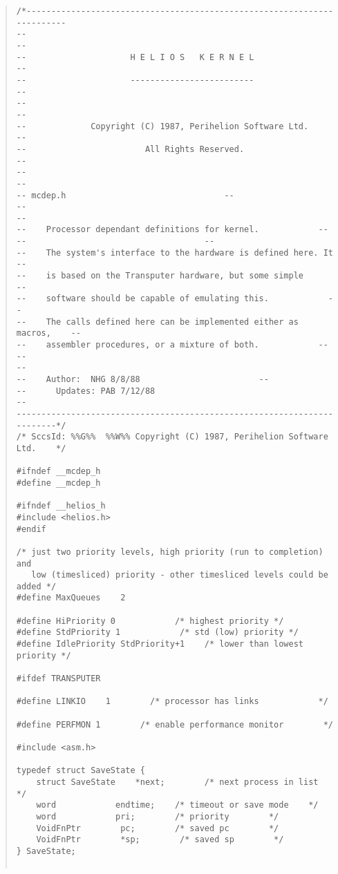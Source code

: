 \begin {quote}
\scriptsize
\begin{verbatim}
/*------------------------------------------------------------------------
--                                                                      --
--                     H E L I O S   K E R N E L                        --
--                     -------------------------                        --
--                                                                      --
--             Copyright (C) 1987, Perihelion Software Ltd.             --
--                        All Rights Reserved.                          --
--                                                                      --
-- mcdep.h                                --
--                                                                      --
--    Processor dependant definitions for kernel.            --
--                                    --
--    The system's interface to the hardware is defined here. It    --
--    is based on the Transputer hardware, but some simple        --
--    software should be capable of emulating this.            --
--    The calls defined here can be implemented either as macros,    --
--    assembler procedures, or a mixture of both.            --
--                                                                      --
--    Author:  NHG 8/8/88                        --
--      Updates: PAB 7/12/88                                            --
------------------------------------------------------------------------*/
/* SccsId: %%G%%  %%W%% Copyright (C) 1987, Perihelion Software Ltd.    */

#ifndef __mcdep_h
#define __mcdep_h

#ifndef __helios_h
#include <helios.h>
#endif

/* just two priority levels, high priority (run to completion) and
   low (timesliced) priority - other timesliced levels could be added */
#define MaxQueues    2

#define HiPriority 0            /* highest priority */
#define StdPriority 1            /* std (low) priority */
#define IdlePriority StdPriority+1    /* lower than lowest priority */

#ifdef TRANSPUTER

#define LINKIO    1        /* processor has links            */

#define PERFMON 1        /* enable performance monitor        */

#include <asm.h>

typedef struct SaveState {
    struct SaveState    *next;        /* next process in list    */
    word            endtime;    /* timeout or save mode    */
    word            pri;        /* priority        */
    VoidFnPtr        pc;        /* saved pc        */
    VoidFnPtr        *sp;        /* saved sp        */
} SaveState;


\end{verbatim}
\end{quote}
